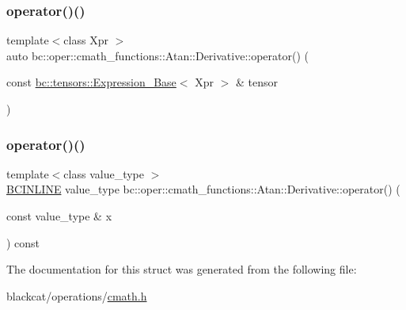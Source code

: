 \mbox{\label{structbc_1_1oper_1_1cmath__functions_1_1Atan_1_1Derivative_adfe95224645b4ad69c44f7da5a145fea}} 
\subsubsection{\texorpdfstring{operator()()}{operator()()}\hspace{0.1cm}{\footnotesize\ttfamily [2/3]}}
{\footnotesize\ttfamily template$<$class Xpr $>$ \\
auto bc\+::oper\+::cmath\+\_\+functions\+::\+Atan\+::\+Derivative\+::operator() (\begin{DoxyParamCaption}\item[{const \hyperlink{classbc_1_1tensors_1_1Expression__Base}{bc\+::tensors\+::\+Expression\+\_\+\+Base}$<$ Xpr $>$ \&}]{tensor }\end{DoxyParamCaption})\hspace{0.3cm}{\ttfamily [inline]}}

\mbox{\label{structbc_1_1oper_1_1cmath__functions_1_1Atan_1_1Derivative_a881e1794e99048dd6430aa031dc9bccf}} 
\subsubsection{\texorpdfstring{operator()()}{operator()()}\hspace{0.1cm}{\footnotesize\ttfamily [3/3]}}
{\footnotesize\ttfamily template$<$class value\+\_\+type $>$ \\
\hyperlink{common_8h_a6699e8b0449da5c0fafb878e59c1d4b1}{B\+C\+I\+N\+L\+I\+NE} value\+\_\+type bc\+::oper\+::cmath\+\_\+functions\+::\+Atan\+::\+Derivative\+::operator() (\begin{DoxyParamCaption}\item[{const value\+\_\+type \&}]{x }\end{DoxyParamCaption}) const\hspace{0.3cm}{\ttfamily [inline]}}



The documentation for this struct was generated from the following file\+:\begin{DoxyCompactItemize}
\item 
blackcat/operations/\hyperlink{cmath_8h}{cmath.\+h}\end{DoxyCompactItemize}
